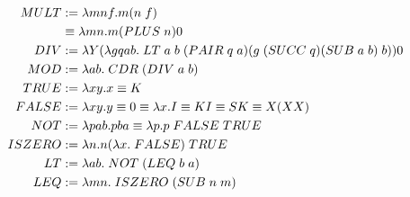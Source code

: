 \[
    \begin{aligned}
        MULT &:= \lambda mnf. m(n \hspace{0.1cm} f)\\
            &\equiv \lambda mn. m (PLUS \hspace{0.1cm} n) 0\\
        DIV &:= \lambda Y (\lambda gqab. \hspace{0.1cm} LT \hspace{0.1cm} a \hspace{0.1cm} b \hspace{0.1cm} (PAIR \hspace{0.1cm} q \hspace{0.1cm} a)(g \hspace{0.1cm} (SUCC \hspace{0.1cm} q) (SUB \hspace{0.1cm} a \hspace{0.1cm} b) \hspace{0.1cm} b)) 0\\
        MOD &:= \lambda ab. \hspace{0.1cm} CDR \hspace{0.1cm} (DIV \hspace{0.1cm} a \hspace{0.1cm} b)\\
        TRUE &:= \lambda xy. x \equiv K\\
        FALSE &:= \lambda xy. y \equiv 0 \equiv \lambda x. I \equiv K I \equiv S K \equiv X (X X)\\
        NOT &:= \lambda pab. p  b a \equiv \lambda p. p \hspace{0.1cm} FALSE \hspace{0.1cm} TRUE\\
        ISZERO &:= \lambda n. n (\lambda x. \hspace{0.1cm} FALSE) \hspace{0.1cm} TRUE\\
        LT &:= \lambda ab. \hspace{0.1cm} NOT \hspace{0.1cm} (LEQ \hspace{0.1cm} b \hspace{0.1cm} a)\\
        LEQ &:= \lambda mn. \hspace{0.1cm} ISZERO \hspace{0.1cm} (SUB \hspace{0.1cm} n \hspace{0.1cm} m)\\

\end{aligned}\]
